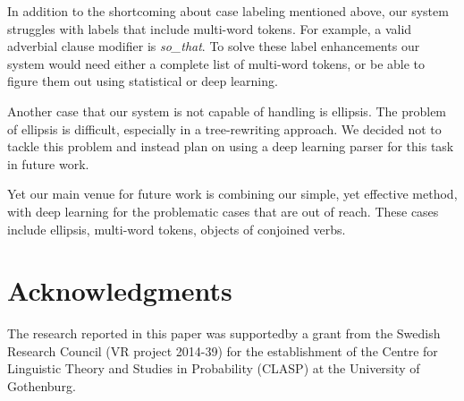 \documentclass[11pt,a4paper]{article}
\begin{document}
In addition to the shortcoming about case labeling mentioned above,
our system struggles with labels that include multi-word tokens. For
example, a valid adverbial clause modifier is \textit{so\_that}. To
solve these label enhancements our system would need either a complete
list of multi-word tokens, or be able to figure them out using
statistical or deep learning.

Another case that our system is not capable of handling is
ellipsis. The problem of ellipsis is difficult, especially in a
tree-rewriting approach. We decided not to tackle this problem and
instead plan on using a deep learning parser for this task in future work.

Yet our main venue for future work is combining our simple, yet effective
method, with deep learning for the problematic cases that are out of
reach. These cases include ellipsis, multi-word tokens, objects of
conjoined verbs.




    
\section*{Acknowledgments}
The research reported in this paper was supportedby a grant from
the Swedish Research Council (VR project 2014-39) for the
establishment of the Centre for Linguistic Theory and Studies in
Probability (CLASP) at the University of Gothenburg.



\end{document}
